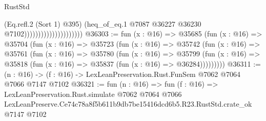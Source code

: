 \begin{lexlean}{RustStd}
\begin{coremodule}
                                            (Eq.refl.{2} (Sort 1) @395)
                                            (heq_of_eq.{1}
                                              @7087
                                              @36227
                                              @36230
                                              @7102)))))))))))))))))))))
@36303 := fun (x : @16) =>
  @35685
    (fun (x : @16) =>
    @35704
      (fun (x : @16) =>
      @35723
        (fun (x : @16) =>
        @35742
          (fun (x : @16) =>
          @35761
            (fun (x : @16) =>
            @35780
              (fun (x : @16) =>
              @35799
                (fun (x : @16) => @35818 (fun (x : @16) => @35837 (fun (x : @16) => @36284)))))))))
@36311 := (n : @16) -> (f : @16) -> LexLeanPreservation.Rust.FunSem @7062 @7064 @7066 @7147 @7102
@36321 := fun (n : @16) =>
  fun (f : @16) =>
  LexLeanPreservation.Rust.simulate
    @7062
    @7064
    @7066
    LexLeanPreserve.Ce74c78a8f5b611b9db7be15416dcd6b5.R23.RustStd.crate_ok
    @7147
    @7102
\end{coremodule}
\end{lexlean}

